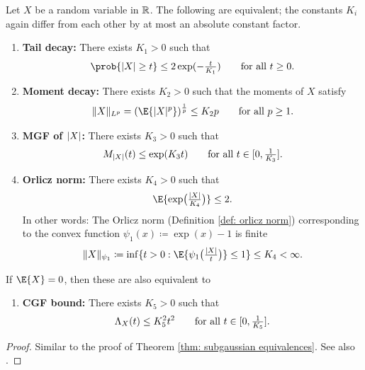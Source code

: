 \begin{mdframed}[innertopmargin=0pt]
\begin{theorem}
    Let \(X\) be a random variable in \(\mathbb{R}\). The following are equivalent; the
    constants \(K_i\) again differ from each other by at most an absolute constant
    factor.
    \begin{enumerate}[label=(\roman*), noitemsep]
        \item\label{it: (sub-exponential) tail decay}
        \textbf{Tail decay:} There exists \(K_1>0\) such that
        \[
            \prob{\abs{X} \ge t}
            \le 2\exp(-\tfrac{t}{K_1})
            \qquad \text{for all } t\ge 0.
        \]

        \item\label{it: (sub-exponential) moment decay}
        \textbf{Moment decay:} There exists \(K_2 > 0\) such that
        the moments of \(X\) satisfy
        \[
            \norm{X}_{L^p} = (\E{\abs{X}^p})^{\frac1p} \le K_2 p
            \qquad \text{for all } p\ge 1.
        \]

        \item\label{it: (sub-exponential) MGF of |X|}
        \textbf{MGF of \(\lvert X\rvert\):}
        There exists \(K_3>0\) such that
        \[
            M_{\lvert X\rvert}(t)
            \le \exp(K_3 t)
            \qquad \text{for all } t\in [0, \tfrac1{K_3}].
        \]

        \item\label{it: (sub-exponential) Orlicz norm}
        \textbf{Orlicz norm:} There exists \(K_4>0\) such that
        \[
            \E{\exp\bigl(\tfrac{\abs{X}}{K_4}\bigr)} \le 2.
        \]
        In other words: The Orlicz norm (Definition \ref{def: orlicz norm})
        corresponding to the convex function \(\psi_1(x) \coloneq \exp(x) - 1\) is finite
        \[
            \norm{X}_{\psi_1} \coloneq \inf\set{t > 0 :
            \E{\psi_1\bigl(\tfrac{\abs{X}}t\bigr)} \le 1}
            \le K_4 < \infty.
        \]

    \end{enumerate}
    If \(\E{X} = 0\), then these are also equivalent to
    \begin{enumerate}[resume, label=(\roman*), noitemsep]
        \item\label{it: (sub-exponential) CGF bound}
        \textbf{CGF bound:} There exists \(K_5>0\) such that
        \[
            \Lambda_X(t) \le K_5^2 t^2
            \qquad \text{for all } t\in [0, \tfrac1{K_5}].
        \]
    \end{enumerate}
\end{theorem}
\end{mdframed}
\begin{proof}
    Similar to the proof of Theorem \ref{thm: subgaussian equivalences}.
    See also \citep[Prop.~2.7.1]{vershyninHighDimensionalProbabilityIntroduction2018}.
\end{proof}

